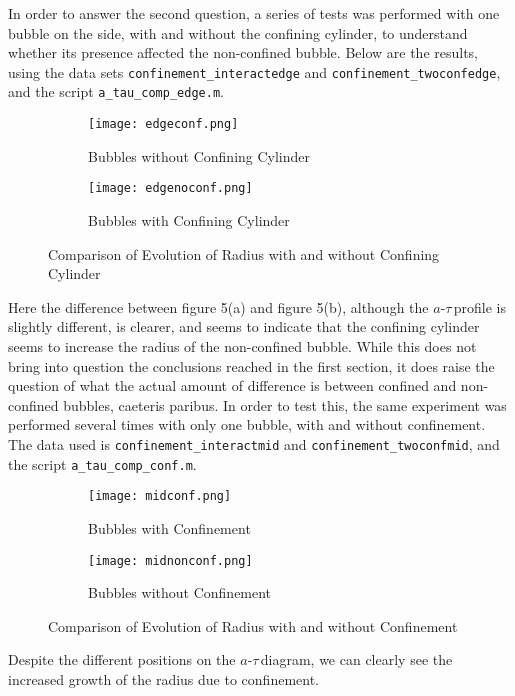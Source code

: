 \documentclass{article}
\newcommand{\at}{$a$-$\tau$\,}
\begin{document}
In order to answer the second question, a series of tests was performed with one bubble on the side, with and without the confining cylinder, to understand whether its presence affected the non-confined bubble. Below are the results, using the data sets \texttt{confinement\_interactedge} and \texttt{confinement\_twoconfedge}, and the script \texttt{a\_tau\_comp\_edge.m}.
\begin{figure}[H]
  \centering
  \begin{subfigure}[b]{0.49\linewidth}
    \texttt{[image: edgeconf.png]}
    \caption{Bubbles without Confining Cylinder}
  \end{subfigure}
  \begin{subfigure}[b]{0.49\linewidth}
    \texttt{[image: edgenoconf.png]}
    \caption{Bubbles with Confining Cylinder}
  \end{subfigure}
  \caption{Comparison of Evolution of Radius with and without Confining Cylinder}
\end{figure}
Here the difference between figure 5(a) and figure 5(b), although the \at profile is slightly different, is clearer, and seems to indicate that the confining cylinder seems to increase the radius of the non-confined bubble. While this does not bring into question the conclusions reached in the first section, it does raise the question of what the actual amount of difference is between confined and non-confined bubbles, caeteris paribus. In order to test this, the same experiment was performed several times with only one bubble, with and without confinement. The data used is \texttt{confinement\_interactmid} and \texttt{confinement\_twoconfmid}, and the script \texttt{a\_tau\_comp\_conf.m}.
\begin{figure}[H]
  \centering
  \begin{subfigure}[b]{0.49\linewidth}
    \texttt{[image: midconf.png]}
    \caption{Bubbles with Confinement}
  \end{subfigure}
  \begin{subfigure}[b]{0.49\linewidth}
    \texttt{[image: midnonconf.png]}
    \caption{Bubbles without Confinement}
  \end{subfigure}
  \caption{Comparison of Evolution of Radius with and without Confinement}
\end{figure}
Despite the different positions on the \at diagram, we can clearly see the increased growth of the radius due to confinement.
\end{document}
